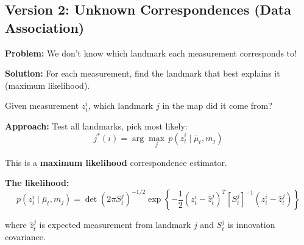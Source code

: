 \subsection{Version 2: Unknown Correspondences (Data Association)}

\textbf{Problem:} We don't know which landmark each measurement corresponds to!

\textbf{Solution:} For each measurement, find the landmark that best explains it (maximum likelihood).

\begin{tcolorbox}[colback=red!5!white,colframe=red!75!black,title=The Data Association Problem]

Given measurement $z_t^i$, which landmark $j$ in the map did it come from?

\textbf{Approach:} Test all landmarks, pick most likely:
\begin{equation}
j^*(i) = \arg\max_j \, p(z_t^i \mid \bar{\mu}_t, m_j)
\end{equation}

This is a \textbf{maximum likelihood} correspondence estimator.

\textbf{The likelihood:}
\begin{equation}
p(z_t^i \mid \bar{\mu}_t, m_j) = \det(2\pi S_t^j)^{-1/2} \exp\left\{-\frac{1}{2}(z_t^i - \hat{z}_t^j)^T [S_t^j]^{-1} (z_t^i - \hat{z}_t^j)\right\}
\end{equation}

where $\hat{z}_t^j$ is expected measurement from landmark $j$ and $S_t^j$ is innovation covariance.

\end{tcolorbox}

